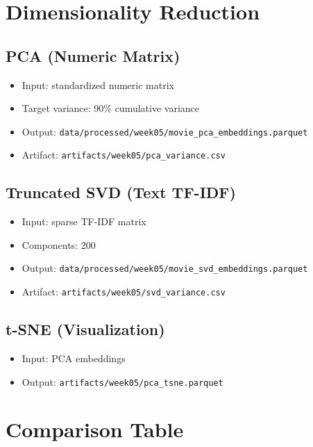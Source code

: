 \documentclass[11pt]{article}
\begin{document}
\section{Dimensionality Reduction}

\subsection{PCA (Numeric Matrix)}

\begin{itemize}[leftmargin=1.5em]
    \item Input: standardized numeric matrix
    \item Target variance: 90\% cumulative variance
    \item Output: \texttt{data/processed/week05/movie\_pca\_embeddings.parquet}
    \item Artifact: \texttt{artifacts/week05/pca\_variance.csv}
\end{itemize}

\subsection{Truncated SVD (Text TF-IDF)}

\begin{itemize}[leftmargin=1.5em]
    \item Input: sparse TF-IDF matrix
    \item Components: 200
    \item Output: \texttt{data/processed/week05/movie\_svd\_embeddings.parquet}
    \item Artifact: \texttt{artifacts/week05/svd\_variance.csv}
\end{itemize}

\subsection{t-SNE (Visualization)}

\begin{itemize}[leftmargin=1.5em]
    \item Input: PCA embeddings
    \item Output: \texttt{artifacts/week05/pca\_tsne.parquet}
\end{itemize}

\section{Comparison Table}
\end{document}
